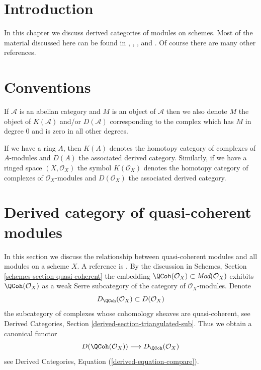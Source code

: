 \section{Introduction}
\label{perfect-section-introduction}
In this chapter we discuss derived categories of modules on schemes.
Most of the material discussed here can be found in
\cite{TT}, \cite{Bokstedt-Neeman}, \cite{BvdB}, and \cite{LN}.
Of course there are many other references.

\section{Conventions}
\label{perfect-section-conventions}
If $\mathcal{A}$ is an abelian category and $M$ is an object
of $\mathcal{A}$ then we also denote $M$ the object of $K(\mathcal{A})$
and/or $D(\mathcal{A})$ corresponding to the complex which has
$M$ in degree $0$ and is zero in all other degrees.

\medskip\noindent
If we have a ring $A$, then $K(A)$ denotes the homotopy category
of complexes of $A$-modules and $D(A)$ the associated derived category.
Similarly, if we have a ringed space $(X, \mathcal{O}_X)$ the symbol
$K(\mathcal{O}_X)$ denotes the homotopy category of complexes of
$\mathcal{O}_X$-modules and $D(\mathcal{O}_X)$ the associated derived
category.

\section{Derived category of quasi-coherent modules}
\label{perfect-section-derived-quasi-coherent}
In this section we discuss the relationship between quasi-coherent
modules and all modules on a scheme $X$. A reference is
\cite[Appendix B]{TT}. By the discussion in
Schemes, Section \ref{schemes-section-quasi-coherent}
the embedding
$\QCoh(\mathcal{O}_X) \subset \textit{Mod}(\mathcal{O}_X)$
exhibits $\QCoh(\mathcal{O}_X)$ as a weak Serre subcategory of
the category of $\mathcal{O}_X$-modules. Denote
$$
D_\QCoh(\mathcal{O}_X) \subset D(\mathcal{O}_X)
$$
the subcategory of complexes whose cohomology sheaves are quasi-coherent, see
Derived Categories, Section \ref{derived-section-triangulated-sub}.
Thus we obtain a canonical functor
\begin{equation}
\label{equation-compare}
D(\QCoh(\mathcal{O}_X))
\longrightarrow
D_\QCoh(\mathcal{O}_X)
\end{equation}
see Derived Categories, Equation (\ref{derived-equation-compare}).

